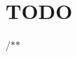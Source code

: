 \chapter{TODO}
\hypertarget{md__t_o_d_o}{}\label{md__t_o_d_o}
/\texorpdfstring{$\ast$}{*}\texorpdfstring{$\ast$}{*} 